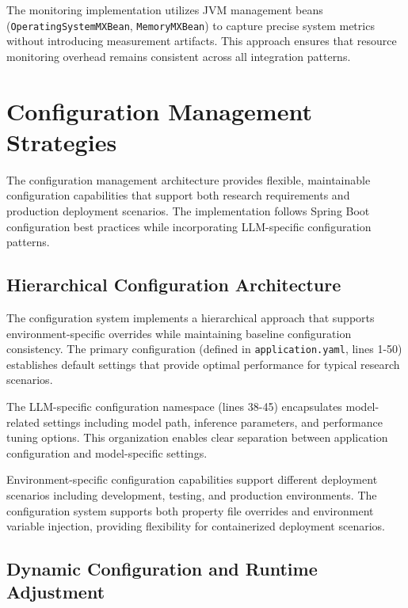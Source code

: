 
The monitoring implementation utilizes JVM management beans (\texttt{OperatingSystemMXBean}, \texttt{MemoryMXBean}) to capture precise system metrics without introducing measurement artifacts. This approach ensures that resource monitoring overhead remains consistent across all integration patterns.


\section{Configuration Management Strategies}

The configuration management architecture provides flexible, maintainable configuration capabilities that support both research requirements and production deployment scenarios. The implementation follows Spring Boot configuration best practices while incorporating LLM-specific configuration patterns.

\subsection{Hierarchical Configuration Architecture}

The configuration system implements a hierarchical approach that supports environment-specific overrides while maintaining baseline configuration consistency. The primary configuration (defined in \texttt{application.yaml}, lines 1-50) establishes default settings that provide optimal performance for typical research scenarios.


The LLM-specific configuration namespace (lines 38-45) encapsulates model-related settings including model path, inference parameters, and performance tuning options. This organization enables clear separation between application configuration and model-specific settings.

Environment-specific configuration capabilities support different deployment scenarios including development, testing, and production environments. The configuration system supports both property file overrides and environment variable injection, providing flexibility for containerized deployment scenarios.

\subsection{Dynamic Configuration and Runtime Adjustment}

